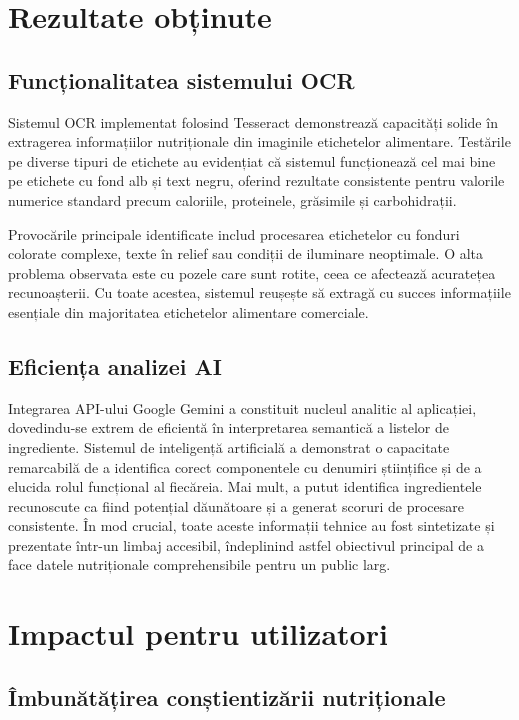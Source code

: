 \section{Rezultate obținute}

\subsection{Funcționalitatea sistemului OCR}

Sistemul OCR implementat folosind Tesseract demonstrează capacități solide în extragerea informațiilor nutriționale din imaginile etichetelor alimentare. Testările pe diverse tipuri de etichete au evidențiat că sistemul funcționează cel mai bine pe etichete cu fond alb și text negru, oferind rezultate consistente pentru valorile numerice standard precum caloriile, proteinele, grăsimile și carbohidrații.

Provocările principale identificate includ procesarea etichetelor cu fonduri colorate complexe, texte în relief sau condiții de iluminare neoptimale. O alta problema observata este cu pozele care sunt rotite, ceea ce afectează acuratețea recunoașterii. Cu toate acestea, sistemul reușește să extragă cu succes informațiile esențiale din majoritatea etichetelor alimentare comerciale.

\subsection{Eficiența analizei AI}

Integrarea API-ului Google Gemini a constituit nucleul analitic al aplicației, dovedindu-se extrem de eficientă în interpretarea semantică a listelor de ingrediente. Sistemul de inteligență artificială a demonstrat o capacitate remarcabilă de a identifica corect componentele cu denumiri științifice și de a elucida rolul funcțional al fiecăreia. Mai mult, a putut identifica ingredientele recunoscute ca fiind potențial dăunătoare și a generat scoruri de procesare consistente. În mod crucial, toate aceste informații tehnice au fost sintetizate și prezentate într-un limbaj accesibil, îndeplinind astfel obiectivul principal de a face datele nutriționale comprehensibile pentru un public larg.

\section{Impactul pentru utilizatori}

\subsection{Îmbunătățirea conștientizării nutriționale}

